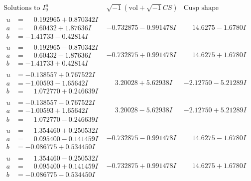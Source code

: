 \documentclass[1p]{elsarticle_modified}
\theoremstyle{definition}
\newcommand{\I}{\sqrt{-1}}
\begin{document}
$$\begin{array}{c|c|c}  
\text{Solutions to }I^u_{9}& \I (\text{vol} + \sqrt{-1}CS) & \text{Cusp shape}\\
 \hline 
\begin{aligned}
u &= \phantom{-}0.192965 + 0.870342 I \\
a &= \phantom{-}0.60432 + 1.87636 I \\
b &= -1.41733 - 0.42814 I\end{aligned}
 & -0.732875 - 0.991478 I & \phantom{-}14.6275 - 1.6780 I \\ \hline\begin{aligned}
u &= \phantom{-}0.192965 - 0.870342 I \\
a &= \phantom{-}0.60432 - 1.87636 I \\
b &= -1.41733 + 0.42814 I\end{aligned}
 & -0.732875 + 0.991478 I & \phantom{-}14.6275 + 1.6780 I \\ \hline\begin{aligned}
u &= -0.138557 + 0.767522 I \\
a &= -1.00593 - 1.65642 I \\
b &= \phantom{-}1.072770 + 0.246639 I\end{aligned}
 & \phantom{-}3.20028 + 5.62938 I & -2.12750 - 5.21289 I \\ \hline\begin{aligned}
u &= -0.138557 - 0.767522 I \\
a &= -1.00593 + 1.65642 I \\
b &= \phantom{-}1.072770 - 0.246639 I\end{aligned}
 & \phantom{-}3.20028 - 5.62938 I & -2.12750 + 5.21289 I \\ \hline\begin{aligned}
u &= \phantom{-}1.354460 + 0.250532 I \\
a &= \phantom{-}0.095400 - 0.141459 I \\
b &= -0.086775 + 0.534450 I\end{aligned}
 & -0.732875 - 0.991478 I & \phantom{-}14.6275 - 1.6780 I \\ \hline\begin{aligned}
u &= \phantom{-}1.354460 - 0.250532 I \\
a &= \phantom{-}0.095400 + 0.141459 I \\
b &= -0.086775 - 0.534450 I\end{aligned}
 & -0.732875 + 0.991478 I & \phantom{-}14.6275 + 1.6780 I \\ \hline\begin{aligned}

\end{aligned}
\end{array}$$
\end{document}
